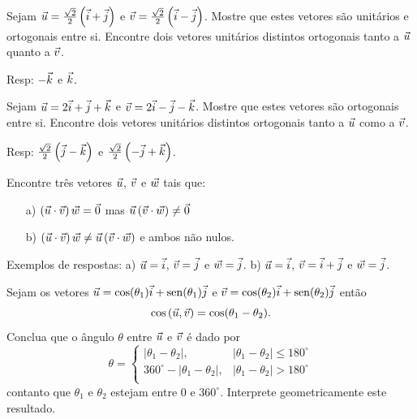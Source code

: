 \begin{exer}\label{exort1}Sejam $\vec{u}=\frac{\sqrt{2}}{2}\left(\vec{i}+\vec{j}\right)$ e $\vec{v}=\frac{\sqrt{2}}{2}\left(\vec{i}-\vec{j}\right)$. Mostre que estes vetores são unitários e ortogonais entre si. Encontre dois vetores unitários distintos ortogonais tanto a $\vec{u}$ quanto a $\vec{v}$.
\end{exer}
Resp: $-\vec{k}$ e $\vec{k}$.

\begin{exer}\label{exort2} Sejam $\vec{u}=2\vec{i}+\vec{j}+\vec{k}$ e $\vec{v}=2\vec{i}-\vec{j}-\vec{k}$. Mostre que estes vetores são ortogonais entre si. Encontre dois vetores unitários distintos ortogonais tanto a  $\vec{u}$ como a $\vec{v}$.
\end{exer}
Resp: $\frac{\sqrt{2}}{2}\left(\vec{j}-\vec{k}\right)$ e $\frac{\sqrt{2}}{2}\left(-\vec{j}+\vec{k}\right)$.

\begin{exer} Encontre três vetores $\vec{u}$, $\vec{v}$ e $\vec{w}$ tais que:
\begin{itemize}
\item [a)] $\left(\vec{u}\cdot\vec{v}\right)\vec{w}=\vec{0}$ mas $\vec{u}\left(\vec{v}\cdot\vec{w}\right)\neq \vec{0}$ 
\item [b)] $\left(\vec{u}\cdot\vec{v}\right)\vec{w}\neq \vec{u}\left(\vec{v}\cdot\vec{w}\right)$ e ambos não nulos. 
\end{itemize}
\end{exer}

Exemplos de respostas: a) $\vec{u}=\vec{i}$, $\vec{v}=\vec{j}$ e $\vec{w}=\vec{j}$. b) $\vec{u}=\vec{i}$, $\vec{v}=\vec{i}+\vec{j}$ e $\vec{w}=\vec{j}$.

\begin{exer} Sejam os vetores $\vec{u}=\cos(\theta_1)\vec{i}+\operatorname{sen}(\theta_1)\vec{j}$ e $\vec{v}=\cos(\theta_2)\vec{i}+\operatorname{sen}(\theta_2)\vec{j}$ então
$$\cos\left(\vec{u},\vec{v}\right)=\cos(\theta_1-\theta_2).$$
Conclua que o ângulo $\theta$ entre $\vec{u}$ e $\vec{v}$ é dado por
$$\theta=\left\{
\begin{array}{ll}
|\theta_1-\theta_2|,& |\theta_1-\theta_2|\leq 180^\circ\\
360^\circ-|\theta_1-\theta_2|,& |\theta_1-\theta_2|> 180^\circ\\
\end{array}
\right.$$ 
contanto que $\theta_1$ e $\theta_2$ estejam entre $0$ e $360^\circ$.
Interprete geometricamente este resultado.
\end{exer}

